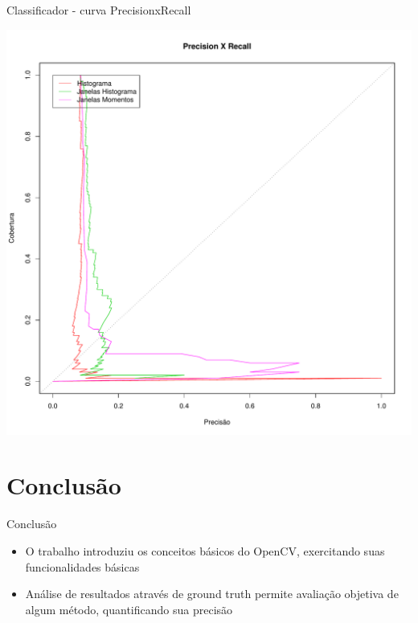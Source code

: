 \documentclass[
    style=paintings,
    paper=screen,
    blackslide,
    nopagebreaks,
    fleqn
]{powerdot}
\begin{document}
\begin{slide}{Classificador - curva PrecisionxRecall}
\begin{center}
\includegraphics[width=0.65\linewidth]{img/precision_recall}
\end{center}
\end{slide}


\section[slide=false]{Conclusão}
\begin{slide}{Conclusão}
\begin{itemize}[type=1]
\item <1-> O trabalho introduziu os conceitos básicos do OpenCV, exercitando suas funcionalidades básicas
\item <2-> Análise de resultados através de ground truth permite avaliação objetiva de algum método, quantificando sua precisão
\end{itemize}
\end{slide}

%
%
\end{document}
